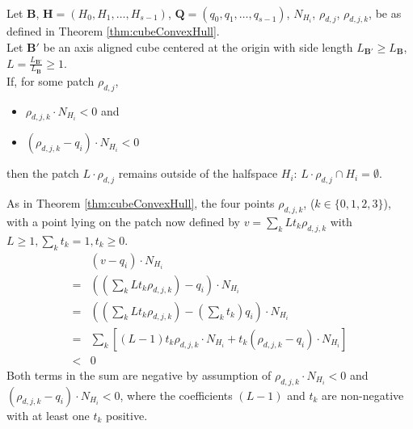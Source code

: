 \documentclass[a4paper,fleqn]{cas-dc}
\begin{document}
\begin{theorem}
  \label{thm:growSecure}
  \ \\
  Let $\mathbf{B}$, $\mathbf{H} = (H _ 0, H _ 1, \dots, H _ {s-1})$,
  $\mathbf{Q} = (q _ 0, q _ 1, \dots, q _ {s-1})$, $N _ {H _ i}$,
  $\rho _ {d,j}$, $\rho _ {d,j,k}$, 
  be as defined in Theorem \ref{thm:cubeConvexHull}. \\
  Let $\mathbf{B'}$ be an axis aligned cube centered at the origin with side length $L _ {\mathbf{B'}} \ge L _ {\mathbf{B}}$,
  $L = \frac{L _ {\mathbf{B'}}}{L _ {\mathbf{B}}} \ge 1$. \\
  If, for some patch $\rho _ {d,j}$, 
  \begin{itemize}
    \item[ ] $\rho _ {d,j,k} \cdot N _ {H _ i} < 0$ and 
    \item[ ] $(\rho _ {d,j,k} - q _ i) \cdot N _ {H _ i} < 0$
  \end{itemize}
  then the patch $L \cdot \rho _ {d,j}$ remains outside of the halfspace $H _ i$: $L \cdot \rho _ {d,j} \cap H _ i = \emptyset$.
\end{theorem}

\begin{pf}
  As in Theorem \ref{thm:cubeConvexHull}, the four points
  $\rho _ {d,j,k}$, ($k \in \{0,1,2,3\}$),
  with a point lying on the patch now defined by
  $v = \sum _ k L t _ k \rho _ {d,j,k}$ with $L \ge 1, \sum _ k t _k = 1, t _k \ge 0$. \\
  $$
  \begin{array}{ll}
   & ( v - q _ i ) \cdot N _ {H _ i}  \\
    = & ( (\sum _ k L t _ k \rho _ {d,j,k} ) - q _ i ) \cdot N _ {H _ i} \\
    = & ( (\sum _ k L t _ k \rho _ {d,j,k} ) - (\sum _ k t _ k ) q _ i ) \cdot N _ {H _ i} \\
    = & \sum _ k [ (L-1) t _ k \rho _ {d,j,k} \cdot N _ { H _ i}  + t _ k ( \rho _ {d,j,k} - q _ i ) \cdot N _ {H _ i} ] \\
    < & 0
  \end{array}
  $$
  Both terms in the sum are negative by assumption of $\rho _ {d,j,k} \cdot N _ {H _ i} < 0$
  and $(\rho _ {d,j,k} - q_i) \cdot N _ {H _ i} < 0$, where the coefficients $(L-1)$ and $t _ k$
  are non-negative with at least one $t _ k$ positive.
\end{pf}
\end{document}
